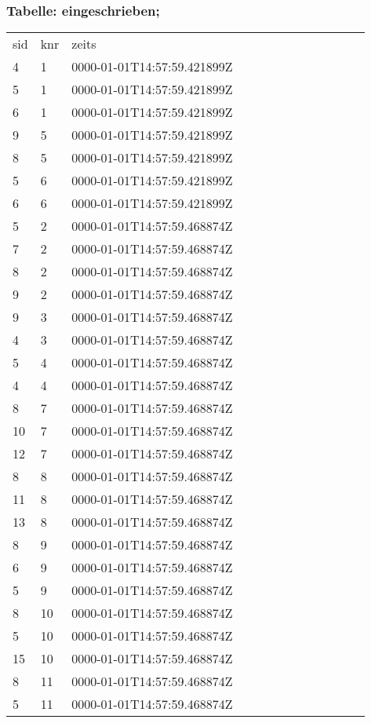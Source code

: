 \documentclass[fleqn]{scrartcl}
\begin{document}
\subsubsection{Tabelle: eingeschrieben;}
\begin{tabular}{|l|l|l|l|l|l|l|l|l|l|l|l|l|}\toprule
\rowcolor{green!20}
\multicolumn{3}{|c|}{
eingeschrieben;
}\\\midrule
\rowcolor{yellow!30}sid & knr  & zeits  \\\midrule
4& 1 & 0000-01-01T14:57:59.421899Z  \\ 
5& 1 & 0000-01-01T14:57:59.421899Z  \\ 
6& 1 & 0000-01-01T14:57:59.421899Z  \\ 
9& 5 & 0000-01-01T14:57:59.421899Z  \\ 
8& 5 & 0000-01-01T14:57:59.421899Z  \\ 
5& 6 & 0000-01-01T14:57:59.421899Z  \\ 
6& 6 & 0000-01-01T14:57:59.421899Z  \\ 
5& 2 & 0000-01-01T14:57:59.468874Z  \\ 
7& 2 & 0000-01-01T14:57:59.468874Z  \\ 
8& 2 & 0000-01-01T14:57:59.468874Z  \\ 
9& 2 & 0000-01-01T14:57:59.468874Z  \\ 
9& 3 & 0000-01-01T14:57:59.468874Z  \\ 
4& 3 & 0000-01-01T14:57:59.468874Z  \\ 
5& 4 & 0000-01-01T14:57:59.468874Z  \\ 
4& 4 & 0000-01-01T14:57:59.468874Z  \\ 
8& 7 & 0000-01-01T14:57:59.468874Z  \\ 
10& 7 & 0000-01-01T14:57:59.468874Z  \\ 
12& 7 & 0000-01-01T14:57:59.468874Z  \\ 
8& 8 & 0000-01-01T14:57:59.468874Z  \\ 
11& 8 & 0000-01-01T14:57:59.468874Z  \\ 
13& 8 & 0000-01-01T14:57:59.468874Z  \\ 
8& 9 & 0000-01-01T14:57:59.468874Z  \\ 
6& 9 & 0000-01-01T14:57:59.468874Z  \\ 
5& 9 & 0000-01-01T14:57:59.468874Z  \\ 
8& 10 & 0000-01-01T14:57:59.468874Z  \\ 
5& 10 & 0000-01-01T14:57:59.468874Z  \\ 
15& 10 & 0000-01-01T14:57:59.468874Z  \\ 
8& 11 & 0000-01-01T14:57:59.468874Z  \\ 
5& 11 & 0000-01-01T14:57:59.468874Z  \\ 
\bottomrule
\end{tabular}
\end{document}
